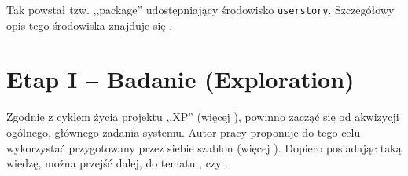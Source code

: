 Tak powstał tzw. ,,package'' udostępniający środowisko \texttt{userstory}. Szczegółowy opis tego środowiska znajduje się .

\section{Etap I -- Badanie (Exploration)}
\label{sec:SWbadanie}

Zgodnie z cyklem życia projektu ,,XP'' (więcej ), powinno zacząć się od akwizycji ogólnego, głównego zadania systemu. Autor pracy proponuje do tego celu wykorzystać przygotowany przez siebie szablon (więcej ). Dopiero posiadając taką wiedzę, można przejść dalej, do tematu , czy .

